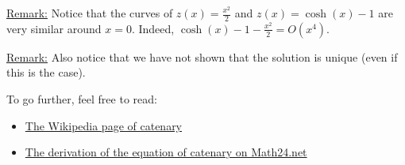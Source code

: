 \underline{Remark:} Notice that the curves of $z(x)=\frac{x^2}{2}$ and $z(x)=\cosh{(x)}-1$ are very similar around $x=0$. Indeed, $\cosh{(x)}-1 - \frac{x^2}{2} = O(x^4)$.

\underline{Remark:} Also notice that we have not shown that the solution is unique (even if this is the case).

To go further, feel free to read:
\begin{itemize}
    \item \href{https://en.wikipedia.org/wiki/Catenary}{The Wikipedia page of catenary}
    \item \href{https://www.math24.net/equation-catenary/}{The derivation of the equation of catenary on Math24.net}
\end{itemize}
